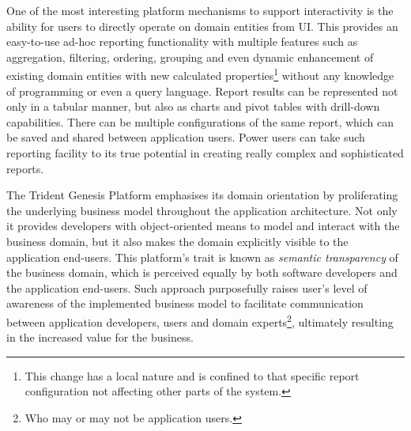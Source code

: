   One of the most interesting platform mechanisms to support interactivity is the ability for users to directly operate on domain entities from UI.
  This provides an easy-to-use ad-hoc reporting functionality with multiple features such as aggregation, filtering, ordering, grouping and even dynamic enhancement of existing domain entities with new calculated properties\footnote{This change has a local nature and is confined to that specific report configuration not affecting other parts of the system.} without any knowledge of programming or even a query language.
  Report results can be represented not only in a tabular manner, but also as charts and pivot tables with drill-down capabilities.
  There can be multiple configurations of the same report, which can be saved and shared between application users.
  Power users can take such reporting facility to its true potential in creating really complex and sophisticated reports.

  The Trident Genesis Platform emphasises its domain orientation by proliferating the underlying business model throughout the application architecture.
  Not only it provides developers with object-oriented means to model and interact with the business domain, but it also makes the domain explicitly visible to the application end-users.
  This platform's trait is known as \emph{semantic transparency} of the business domain, which is perceived equally by both software developers and the application end-users.
  Such approach purposefully raises user's level of awareness of the implemented business model to facilitate communication between application developers, users and domain experts\footnote{Who may or may not be application users.}, ultimately resulting in the increased value for the business.